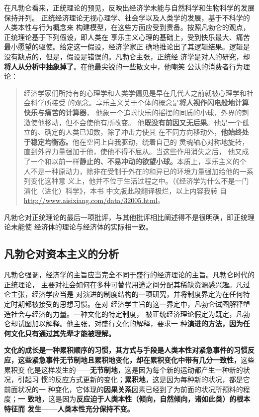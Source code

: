 在凡勃仑看来，正统理论的预见，反映出经济学未能与自然科学和生物科学的发展保持并列。
正统经济理论无视心理学、社会学以及人类学的发展，基于不科学的人类本性与行为概念来
构建模型，在这些方面应受到责备。按照凡勃仑的观点，正统理论基于下列假设，即人类在
享乐主义心理的基础上，受到快乐最大、痛苦最小愿望的驱使。给定这一假设，经济学家正
确地推论出了其逻辑结果。逻辑是没有缺点的，但是，假设是错误的。凡勃仑主张，正统经
济学是对人的研究，却\textbf{将人从分析中抽象掉了}。在他最尖锐的一些散文中，他嘲笑
公认的消费者行为理论：

\begin{quotation}
  经济学家们所持有的心理学和人类学偏见是早在几代人之前就被心理学和社会科学所接受
  的观念。享乐主义关于个体的概念是\textbf{将人视作闪电般地计算快乐与痛苦的计算器}，
  他象一个追求快乐的摇摆的同质的小球，外界的刺激使他移动，但不会使他有所改变。
  他\textbf{既没有前因又无后果}。他是一个孤立的、确定的人类已知数，除了冲击力使其
  在不同方向移动外，\textbf{他始终处于稳定均衡态。}他在空间上自我驱动，绕着自己的
  灵魂轴心对称地旋转，直到外界力量强加于他，使他不得不屈从。当这些作用消失之后，
  他又成了一个和以前一样\textbf{静止的、不易冲动的欲望小球。}本质上，享乐主义的个
  人不是一种原动力，除非在受制于外在的和异已的环境力量强加给他的一系列变化这种意
  义上，他并不位于生活过程之中。（《经济学为什么不是一门演化（进化）科学》，本书
  中文版此段翻译极烂，以上内容我转
  自\url{http://www.aisixiang.com/data/32005.html}。
\end{quotation}

凡勃仑对正统理论的最后一项批评，与其他批评相比阐述得不是很明确，即正统理论未能使
经济体的理论与经济体的实际相一致。

\subsection{凡勃仑对资本主义的分析}

凡勃仑强调，经济学的主旨应当完全不同于盛行的经济理论的主旨。凡勃仑时代的正统理论，
主要对社会如何在多种可替代用途之间分配其稀缺资源感兴趣。凡过仑主张，经济学应当是
对演进的制度结构的一项研究，并将制度界定为在任何特定时期都被接受的思想习惯。在对
经济学主旨的这一界定中，凡勃仑试图解释塑造社会与经济的力量。一种文化的特定制度，
被正统经济理论假定为既定，凡勃仑却试图加以解释。他主张，对盛行文化的解释，要求一
种\textbf{演进的方法，因为任何文化只有通过其先辈才能被理解。}

\textbf{文化的成长是一种累积顺序的习惯，其方式与手段是人类本性对紧急事件的习惯反
  应，这些紧急事件无节制地且累积地变化，却在累积变化中带有几分一致性，}这些累积变
化是这样发生的——\textbf{无节制地}，这是因为每个新的运动都产生一种新的状况，引起习
惯的反应方式更新的变化；\textbf{累积地}，这是因为每种新的状况，都是它前面状况的一
种变化，它体现的\textbf{因果关系}因素已经到了为前面的状况所预料的程度；\textbf{一
  致地}，这是因为\textbf{反应迫于人类本性（倾向，自然倾向，诸如此类）的根本特征而
  发生——人类本性充分保持不变。}


